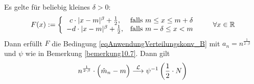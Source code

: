 \begin{beispiel}\label{beispiel10.9}
	Es gelte für beliebig kleines $\delta>0$:
	\begin{align*}
		F(x):=\left\lbrace\begin{array}{cl}
			c\cdot|x-m|^\beta+\frac{1}{2},&\text{falls } m\leq x\leq m+\delta\\
			-d\cdot|x-m|^\beta+\frac{1}{2},&\text{falls } m-\delta\leq x<m
		\end{array}\right.\qquad\forall x\in\mathbb{R}
	\end{align*}
	Dann erfüllt $F$ die Bedingung \eqref{eqAnwendungVerteilungskonv_B} mit $a_n=n^{\frac{1}{2\cdot\beta}}$ und $\psi$ wie in Bemerkung \ref{bemerkung10.7}.
	Dann gilt
	\begin{align*}
		n^{\frac{1}{2\cdot\beta}}\cdot\Big(\hat{m}_n-m\Big)\overset{\mathcal{L}}{\longrightarrow}\psi^{-1}\left(\frac{1}{2}\cdot N\right)
	\end{align*}
\end{beispiel}
